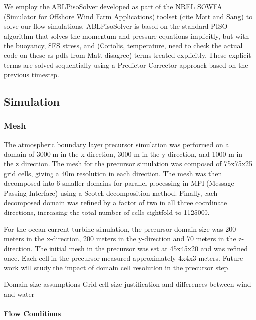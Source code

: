 We employ the ABLPisoSolver developed as part of the NREL SOWFA (Simulator for Offshore Wind Farm Applications) toolset (cite Matt and Sang) to solve our flow simulations.  ABLPisoSolver is based on the standard PISO algorithm that solves the momentum and pressure equations implicitly, but with the buoyancy, SFS stress, and (Coriolis, temperature, need to check the actual code on these as pdfs from Matt disagree) terms treated explicitly.  These explicit terms are solved sequentially using a Predictor-Corrector approach based on the previous timestep.  

\subsection{Simulation}


\subsubsection{Mesh}

The atmospheric boundary layer precursor simulation was performed on a domain of 3000 m in the x-direction, 3000 m in the y-direction, and 1000 m in the z direction.  The mesh for the precursor simulation was composed of 75x75x25 grid cells, giving a 40m resolution in each direction.  The mesh was then decomposed into 6 smaller domains for parallel processing in MPI (Message Passing Interface) using a Scotch decomposition method.  Finally, each decomposed domain was refined by a factor of two in all three coordinate directions, increasing the total number of cells eightfold to 1125000. 

For the ocean current turbine simulation, the precursor domain size was 200 meters in the x-direction, 200 meters in the y-direction and 70 meters in the z-direction. The initial mesh in the precursor was set at 45x45x20 and was refined once. Each cell in the precursor measured approximately 4x4x3 meters. Future work will study the impact of domain cell resolution in the precursor step.


Domain size assumptions
Grid cell size justification and differences between wind and water

\paragraph{Flow Conditions}

